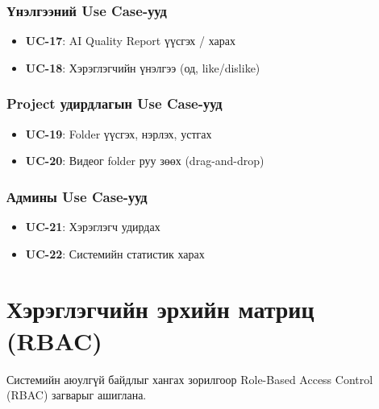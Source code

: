\subsubsection*{Үнэлгээний Use Case-ууд}
\begin{itemize}
  \item \textbf{UC-17}: AI Quality Report үүсгэх / харах
  \item \textbf{UC-18}: Хэрэглэгчийн үнэлгээ (од, like/dislike)
\end{itemize}

\subsubsection*{Project удирдлагын Use Case-ууд}
\begin{itemize}
  \item \textbf{UC-19}: Folder үүсгэх, нэрлэх, устгах
  \item \textbf{UC-20}: Видеог folder руу зөөх (drag-and-drop)
\end{itemize}

\subsubsection*{Админы Use Case-ууд}
\begin{itemize}
  \item \textbf{UC-21}: Хэрэглэгч удирдах
  \item \textbf{UC-22}: Системийн статистик харах
\end{itemize}

\section{Хэрэглэгчийн эрхийн матриц (RBAC)}

Системийн аюулгүй байдлыг хангах зорилгоор Role-Based Access Control (RBAC) загварыг ашиглана.

